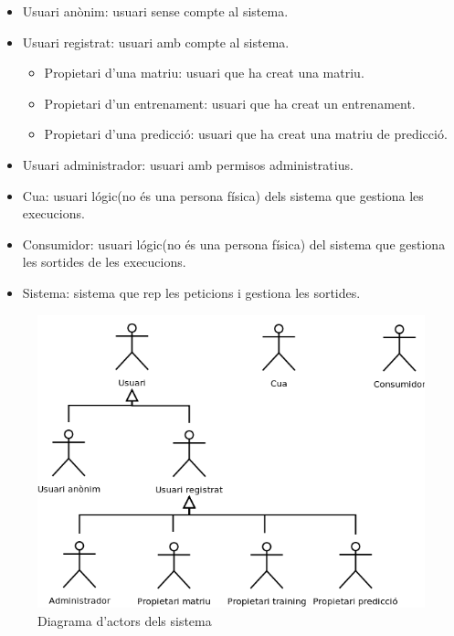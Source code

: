 \begin{itemize}
\item Usuari an\`{o}nim: usuari sense compte al sistema.
\item Usuari registrat: usuari amb compte al sistema.
\begin{itemize}
\item Propietari d'una matriu: usuari que ha creat una matriu.
\item Propietari d'un entrenament: usuari que ha creat un entrenament.
\item Propietari d'una predicci\'{o}: usuari que ha creat una matriu de predicci\'{o}.
\end{itemize}
\item Usuari administrador: usuari amb permisos administratius.
\item Cua: usuari l\'{o}gic(no \'{e}s una persona f\'{i}sica) dels sistema que gestiona les execucions.
\item Consumidor: usuari l\'{o}gic(no \'{e}s una persona f\'{i}sica) del sistema que gestiona les sortides de les execucions.
\item Sistema: sistema que rep les peticions i gestiona les sortides.
\end{itemize}

\begin{figure}[h]
  \centering
  \includegraphics[scale=0.4]{img/specification/Actors.png}
  \caption{Diagrama d'actors dels sistema}
  \label{fig:actors}
\end{figure}

